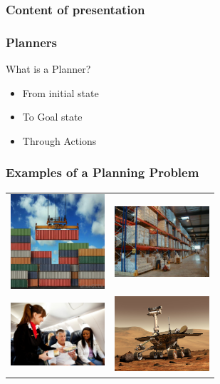 \documentclass{beamer}
\let\origframetitle=\frametitle
\renewcommand\frametitle[1]{\origframetitle{\textbf{\large{\textrm{#1}}}}}
\begin{document}
\begin{frame}
  \frametitle{Content of presentation}

\end{frame}

\begin{frame}
  \frametitle{Planners}

  What is a Planner?

  \begin{itemize}
    \item From \alert{initial state}
    \item To \alert{Goal state}
    \item Through \alert{Actions}
  \end{itemize}

\end{frame}

\begin{frame}
  \frametitle{Examples of a Planning Problem}

  \begin{tabular}{c c}
    \includegraphics[width=3.5cm]{images/containers.jpg}     &
    \includegraphics[width=3.5cm]{images/inventory.jpg}      \\
    \includegraphics[width=3.5cm]{images/airplane-food.jpg}  &
    \includegraphics[width=3.5cm]{images/mars-rover.jpg}
  \end{tabular}

\end{frame}
\end{document}
